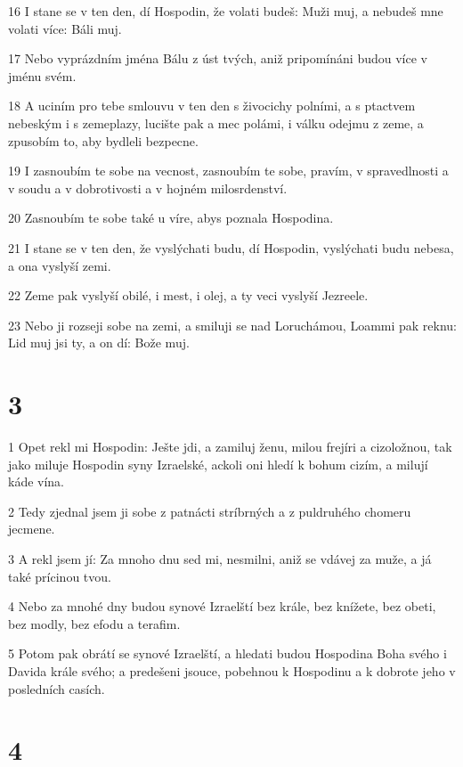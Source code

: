 \par 16 I stane se v ten den, dí Hospodin, že volati budeš: Muži muj, a nebudeš mne volati více: Báli muj.
\par 17 Nebo vyprázdním jména Bálu z úst tvých, aniž pripomínáni budou více v jménu svém.
\par 18 A uciním pro tebe smlouvu v ten den s živocichy polními, a s ptactvem nebeským i s zemeplazy, lucište pak a mec polámi, i válku odejmu z zeme, a zpusobím to, aby bydleli bezpecne.
\par 19 I zasnoubím te sobe na vecnost, zasnoubím te sobe, pravím, v spravedlnosti a v soudu a v dobrotivosti a v hojném milosrdenství.
\par 20 Zasnoubím te sobe také u víre, abys poznala Hospodina.
\par 21 I stane se v ten den, že vyslýchati budu, dí Hospodin, vyslýchati budu nebesa, a ona vyslyší zemi.
\par 22 Zeme pak vyslyší obilé, i mest, i olej, a ty veci vyslyší Jezreele.
\par 23 Nebo ji rozseji sobe na zemi, a smiluji se nad Loruchámou, Loammi pak reknu: Lid muj jsi ty, a on dí: Bože muj.

\chapter{3}

\par 1 Opet rekl mi Hospodin: Ješte jdi, a zamiluj ženu, milou frejíri a cizoložnou, tak jako miluje Hospodin syny Izraelské, ackoli oni hledí k bohum cizím, a milují káde vína.
\par 2 Tedy zjednal jsem ji sobe z patnácti stríbrných a z puldruhého chomeru jecmene.
\par 3 A rekl jsem jí: Za mnoho dnu sed mi, nesmilni, aniž se vdávej za muže, a já také prícinou tvou.
\par 4 Nebo za mnohé dny budou synové Izraelští bez krále, bez knížete, bez obeti, bez modly, bez efodu a terafim.
\par 5 Potom pak obrátí se synové Izraelští, a hledati budou Hospodina Boha svého i Davida krále svého; a predešeni jsouce, pobehnou k Hospodinu a k dobrote jeho v posledních casích.

\chapter{4}

